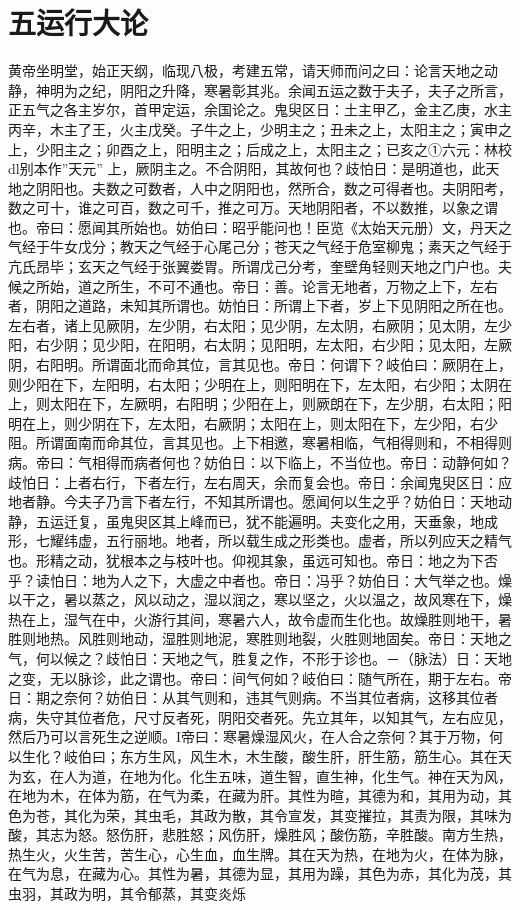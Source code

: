 \documentclass[a4paper,12pt,UTF8,twoside]{ctexbook}
\begin{document}
\chapter{五运行大论}
黄帝坐明堂，始正天纲，临现八极，考建五常，请天师而问之曰：论言天地之动静，神明为之纪，阴阳之升降，寒暑彰其兆。余闻五运之数于夫子，夫子之所言，正五气之各主岁尔，首甲定运，余国论之。鬼臾区日：土主甲乙，金主乙庚，水主丙辛，木主了王，火主戊癸。子牛之上，少明主之；丑未之上，太阳主之；寅申之上，少阳主之；卯酉之上，阳明主之；后成之上，太阳主之；已亥之①六元：林校dl别本作”天元”
上，厥阴主之。不合阴阳，其故何也？歧怕日：是明道也，此天地之阴阳也。夫数之可数者，人中之阴阳也，然所合，数之可得者也。夫阴阳考，数之可十，谁之可百，数之可千，推之可万。天地阴阳者，不以数推，以象之谓也。帝曰：愿闻其所始也。妨伯曰：昭乎能问也！臣览《太始天元册）文，丹天之气经于牛女戊分；教天之气经于心尾己分；苍天之气经于危室柳鬼；素天之气经于亢氏昂毕；玄天之气经于张翼娄胃。所谓戊己分考，奎壁角轻则天地之门户也。夫候之所始，道之所生，不可不通也。帝日：善。论言无地者，万物之上下，左右者，阴阳之道路，未知其所谓也。妨怕日：所谓上下者，岁上下见阴阳之所在也。左右者，诸上见厥阴，左少阴，右太阳；见少阴，左太阴，右厥阴；见太阴，左少阳，右少阴；见少阳，在阳明，右太阴；见阳明，左太阳，右少阳；见太阳，左厥阴，右阳明。所谓面北而命其位，言其见也。帝日：何谓下？岐伯曰：厥阴在上，则少阳在下，左阳明，右太阳；少明在上，则阳明在下，左太阳，右少阳；太阴在上，则太阳在下，左厥明，右阳明；少阳在上，则厥朗在下，左少朋，右太阳；阳明在上，则少阴在下，左太阳，右厥阴；太阳在上，则太阳在下，左少阳，右少阻。所谓面南而命其位，言其见也。上下相邀，寒暑相临，气相得则和，不相得则病。帝曰：气相得而病者何也？妨伯日：以下临上，不当位也。帝日：动静何如？歧怕日：上者右行，下者左行，左右周天，余而复会也。帝日：余闻鬼臾区日：应地者静。今夫子乃言下者左行，不知其所谓也。愿闻何以生之乎？妨伯日：天地动静，五运迁复，虽鬼臾区其上峰而已，犹不能遍明。夫变化之用，天垂象，地成形，七耀纬虚，五行丽地。地者，所以载生成之形类也。虚者，所以列应天之精气也。形精之动，犹根本之与枝叶也。仰视其象，虽远可知也。帝日：地之为下否乎？读怕日：地为人之下，大虚之中者也。帝日：冯乎？妨伯日：大气举之也。燥以干之，暑以蒸之，风以动之，湿以润之，寒以坚之，火以温之，故风寒在下，燥热在上，湿气在中，火游行其间，寒暑六人，故令虚而生化也。故燥胜则地干，暑胜则地热。风胜则地动，湿胜则地泥，寒胜则地裂，火胜则地固矣。帝日：天地之气，何以候之？歧怕日：天地之气，胜复之作，不形于诊也。－（脉法）日：天地之变，无以脉诊，此之谓也。帝曰：间气何如？岐伯曰：随气所在，期于左右。帝日：期之奈何？妨伯日：从其气则和，违其气则病。不当其位者病，这移其位者病，失守其位者危，尺寸反者死，阴阳交者死。先立其年，以知其气，左右应见，然后乃可以言死生之逆顺。I帝曰：寒暑燥湿风火，在人合之奈何？其于万物，何以生化？岐伯曰；东方生风，风生木，木生酸，酸生肝，肝生筋，筋生心。其在天为玄，在人为道，在地为化。化生五味，道生智，直生神，化生气。神在天为风，在地为木，在体为筋，在气为柔，在藏为肝。其性为暄，其德为和，其用为动，其色为苍，其化为荣，其虫毛，其政为散，其令宣发，其变摧拉，其责为限，其味为酸，其志为怒。怒伤肝，悲胜怒；风伤肝，燥胜风；酸伤筋，辛胜酸。南方生热，热生火，火生苦，苦生心，心生血，血生牌。其在天为热，在地为火，在体为脉，在气为息，在藏为心。其性为暑，其德为显，其用为躁，其色为赤，其化为茂，其虫羽，其政为明，其令郁蒸，其变炎烁
\end{document}
